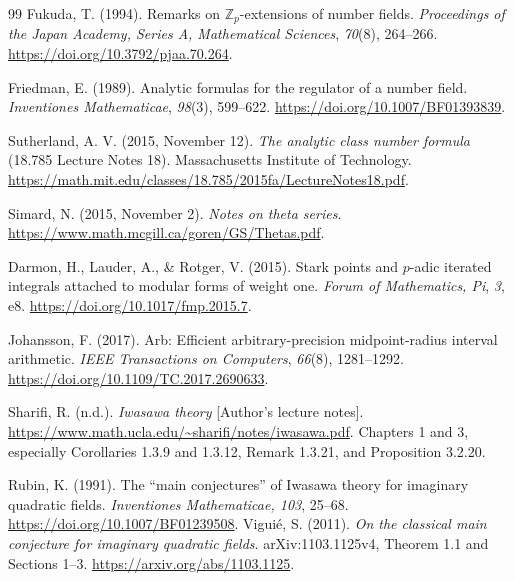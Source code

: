\documentclass[11pt]{article}
\begin{document}
\begin{thebibliography}{99}
Fukuda, T. (1994).
Remarks on $\mathbb Z_p$-extensions of number fields.
\emph{Proceedings of the Japan Academy, Series A, Mathematical Sciences},
\emph{70}(8), 264--266.
\url{https://doi.org/10.3792/pjaa.70.264}.

Friedman, E. (1989).
Analytic formulas for the regulator of a number field.
\emph{Inventiones Mathematicae}, \emph{98}(3), 599--622.
\url{https://doi.org/10.1007/BF01393839}.

Sutherland, A. V. (2015, November 12).
\emph{The analytic class number formula} (18.785 Lecture Notes 18).
Massachusetts Institute of Technology.
\url{https://math.mit.edu/classes/18.785/2015fa/LectureNotes18.pdf}.

Simard, N. (2015, November 2).
\emph{Notes on theta series}.
\url{https://www.math.mcgill.ca/goren/GS/Thetas.pdf}.

Darmon, H., Lauder, A., \& Rotger, V. (2015).
Stark points and $p$-adic iterated integrals attached to modular forms of
weight one.
\emph{Forum of Mathematics, Pi}, \emph{3}, e8.
\url{https://doi.org/10.1017/fmp.2015.7}.

Johansson, F. (2017).
Arb: Efficient arbitrary-precision midpoint-radius interval arithmetic.
\emph{IEEE Transactions on Computers}, \emph{66}(8), 1281--1292.
\url{https://doi.org/10.1109/TC.2017.2690633}.

Sharifi, R. (n.d.).
\emph{Iwasawa theory} [Author's lecture notes].
\url{https://www.math.ucla.edu/~sharifi/notes/iwasawa.pdf}.
Chapters 1 and 3, especially Corollaries 1.3.9 and 1.3.12,
Remark 1.3.21, and Proposition 3.2.20.

 Rubin, K. (1991). The ``main conjectures'' of Iwasawa theory for imaginary quadratic fields. \emph{Inventiones Mathematicae, 103}, 25--68. \url{https://doi.org/10.1007/BF01239508}.
 Vigui\'e, S. (2011). \emph{On the classical main conjecture for imaginary quadratic fields}. arXiv:1103.1125v4, Theorem 1.1 and Sections 1--3. \url{https://arxiv.org/abs/1103.1125}.
\end{thebibliography}
\end{document}
